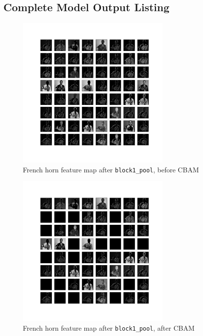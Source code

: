 \documentclass{article}
\begin{document}
\newpage
\begin{appendices}
\section{Complete Model Output Listing} \label{outputlist}

\begin{figure}[H]
    \centering
    \includegraphics[width=3in]{csci-8920/hw-4/images/horn-pre-CBAM-3-block1_pool.png}
    \caption{French horn feature map after \lstinline{block1_pool}, before CBAM}
    \label{fig:horn_2_pre}
\end{figure}

\begin{figure}[H]
    \centering
    \includegraphics[width=3in]{csci-8920/hw-4/images/horn-post-CBAM-3-block1_pool.png}
    \caption{French horn feature map after \lstinline{block1_pool}, after CBAM}
    \label{fig:horn_2_pre}
\end{figure}


\end{appendices}
\end{document}
